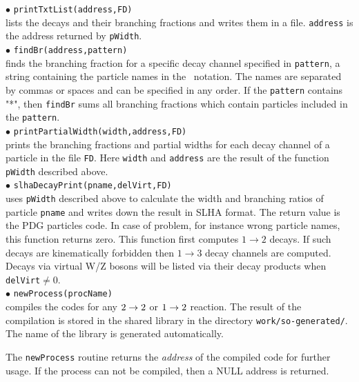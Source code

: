 \documentclass[12pt,a4paper]{article}
\begin{document}
%
\noindent
$\bullet$ \verb|printTxtList(address,FD)|\\
lists the decays and their branching fractions and writes them in a file.
{\tt address} is the address returned by {\tt pWidth}. \\[2mm]
%
\noindent
$\bullet$ \verb|findBr(address,pattern)|\\ 
finds the branching fraction for a specific decay channel specified in
{\tt pattern},  a string containing the particle names 
in the \calchep\ notation. The names are separated by commas or spaces and can be specified in any
order. If the  {\tt pattern} contains  "*", then {\tt findBr} sums all branching fractions
which contain particles included in the {\tt pattern}.\\[2mm]
 \noindent
 $\bullet$ \verb|printPartialWidth(width,address,FD)|\\ 
prints the branching fractions and partial widths for each decay channel of a particle in the file {\tt FD}.   Here {\tt width} and {\tt address} are the result of the function  {\tt pWidth} described above.\\[2mm]
%
\noindent
$\bullet$ \verb|slhaDecayPrint(pname,delVirt,FD)|\\
uses \verb|pWidth| described above to calculate the width and branching ratios of particle \verb|pname| and writes down the result
in SLHA format. The return value is the PDG particles code. In case of problem, for
instance wrong particle names, this function returns zero. This function
first computes $1\to2$  decays. If such decays are kinematically
forbidden then $1\to3$ decay channels are computed. Decays via 
virtual W/Z bosons will be listed via their decay products when \verb|delVirt|$ \ne 0$.\\[2mm]
%
\noindent
$\bullet$ \verb|newProcess(procName)|\\
compiles the  codes for any $2\rightarrow 2$ or  $1\rightarrow 2$  reaction.
The result of the compilation is stored in the  shared library  in the directory \verb|work/so-generated/|. The name of the library is generated
automatically.

The \verb|newProcess| routine returns the
{\it address} of the compiled code for further usage.   If the
process can not be compiled, then a NULL address is
returned. 
\end{document}
